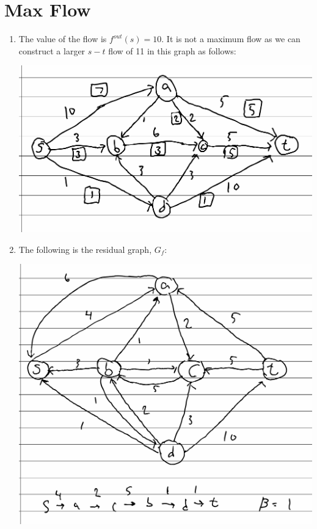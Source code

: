 \documentclass{article}
\begin{document}
\section{Max Flow}
\begin{enumerate}
    \item The value of the flow is $f^{out}(s) = 10$. 
    It is not a maximum flow as we can construct a larger $s - t$ flow of 11 in this graph as follows:

    \includegraphics[width=\textwidth]{1a}

    \newpage
    \item The following is the residual graph, $G_f$:
    
    \includegraphics[width=\textwidth]{1b-1}



\end{enumerate}
\end{document}
